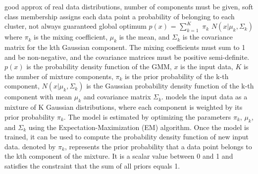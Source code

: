 \documentclass[10pt]{article}
\begin{document}
\smallbreak
{} good approx of real data distributions, number of components must be given, soft class membership assigns each data point a probability of belonging to each cluster, not always guaranteed global optimum
\NEW    $p(x)$ = $\sum_{k=1}^K$ $\pi_k$ $N(x|\mu_k, \Sigma_k)$ where $\pi_k$ is the mixing coefficient, $\mu_k$ is the mean, and $\Sigma_k$ is the covariance matrix for the kth Gaussian component. The mixing coefficients must sum to 1 and be non-negative, and the covariance matrices must be positive semi-definite.
\NEW    $p(x)$ is the probability density function of the GMM, $x$ is the input data, $K$ is the number of mixture components, $\pi_k$ is the prior probability of the k-th component,  $N(x|\mu_k, \Sigma_k)$  is the Gaussian probability density function of the k-th component with mean $\mu_k$ and covariance matrix $\Sigma_k$.
\NEW    [GMM] models the input data as a mixture of K Gaussian distributions, where each component is weighted by its prior probability $\pi_k$. The model is estimated by optimizing the parameters $\pi_k$, $\mu_k$, and $\Sigma_k$ using the Expectation-Maximization (EM) algorithm. Once the model is trained, it can be used to compute the probability density function of new input data.
 denoted by $\pi_k$, represents the prior probability that a data point belongs to the kth component of the mixture. It is a scalar value between 0 and 1 and satisfies the constraint that the sum of all priors equals 1.
\end{document}
